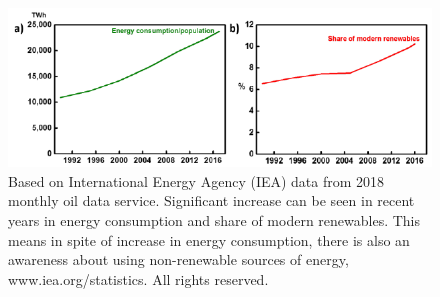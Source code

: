 \begin{figure}[tbh!]
\centering
\includegraphics[width=\textwidth]{Figures/chap1fig/iec.pdf}
\caption{Based on International Energy Agency (IEA) data from 2018 monthly oil data service. Significant increase can be seen in recent years in energy consumption and share of modern renewables. This means in spite  of increase in energy consumption, there is also an awareness about using non-renewable sources of energy, www.iea.org/statistics. All rights reserved.}
\label{Figures/chap1fig:iec}
\end{figure}

